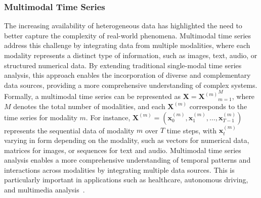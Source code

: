 \subsubsection{Multimodal Time Series}
The increasing availability of heterogeneous data has highlighted the need to better capture the complexity of real-world phenomena. Multimodal time series address this challenge by integrating data from multiple modalities, where each modality represents a distinct type of information, such as images, text, audio, or structured numerical data. By extending traditional single-modal time series analysis, this approach enables the incorporation of diverse and complementary data sources, providing a more comprehensive understanding of complex systems. Formally, a multimodal time series can be represented as $\mathbf{X} = {\mathbf{X}^{(m)}}_{m=1}^M$, where $M$ denotes the total number of modalities, and each $\mathbf{X}^{(m)}$ corresponds to the time series for modality $m$. For instance, $\mathbf{X}^{(m)} = (\mathbf{x}_0^{(m)}, \mathbf{x}_1^{(m)}, \dots, \mathbf{x}_{T-1}^{(m)})$ represents the sequential data of modality $m$ over $T$ time steps, with $\mathbf{x}_t^{(m)}$ varying in form depending on the modality, such as vectors for numerical data, matrices for images, or sequences for text and audio. Multimodal time series analysis enables a more comprehensive understanding of temporal patterns and interactions across modalities by integrating multiple data sources. This is particularly important in applications such as healthcare, autonomous driving, and multimedia analysis~\cite{moor2023foundation,cui2024survey,zhou2024survey}.

